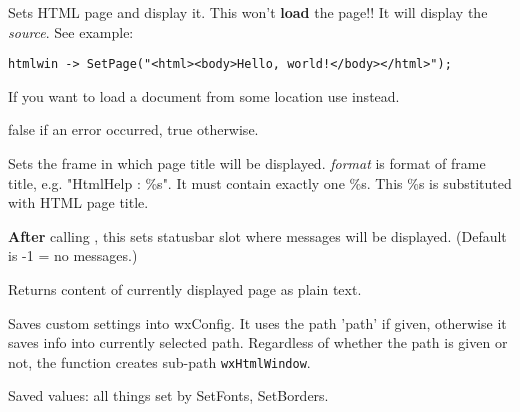 
Sets HTML page and display it. This won't {\bf load} the page!!
It will display the {\it source}. See example:

\begin{verbatim}
htmlwin -> SetPage("<html><body>Hello, world!</body></html>");
\end{verbatim}

If you want to load a document from some location use 
 instead.




false if an error occurred, true otherwise.

\label{wxhtmlwindowsetrelatedframe}


Sets the frame in which page title will be displayed. {\it format} is format of
frame title, e.g. "HtmlHelp : \%s". It must contain exactly one \%s. This
\%s is substituted with HTML page title.

\label{wxhtmlwindowsetrelatedstatusbar}


{\bf After} calling ,
this sets statusbar slot where messages will be displayed.
(Default is -1 = no messages.)



\label{wxhtmlwindowtotext}


Returns content of currently displayed page as plain text.

\label{wxhtmlwindowwritecustomization}


Saves custom settings into wxConfig. It uses the path 'path'
if given, otherwise it saves info into currently selected path.
Regardless of whether the path is given or not, the function creates sub-path 
{\tt wxHtmlWindow}.

Saved values: all things set by SetFonts, SetBorders.





